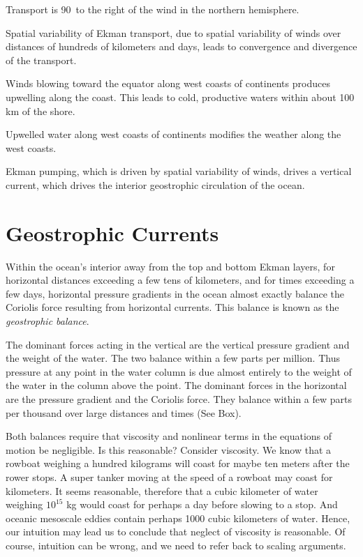 \begin{enumerate}
\vitem Transport is 90\degrees\ to the right of the wind in the
northern hemisphere.

\vitem Spatial variability of Ekman transport, due to spatial
variability of winds over distances of hundreds of kilometers and
days, leads to convergence and divergence of the transport.
\begin{enumerate}
\vitem Winds blowing toward the equator along west coasts of
continents produces upwelling along the
coast. This leads to cold, productive waters within about 100 km of
the shore.

\vitem Upwelled water along west coasts of continents modifies the
weather along the west coasts.
\end{enumerate}

\vitem Ekman pumping, which is driven by spatial
variability of winds, drives a vertical current, which drives the
interior geostrophic circulation of the
ocean.
\end{enumerate}


\chapter{Geostrophic Currents}
Within the ocean's interior away from the top and bottom Ekman
layers, for horizontal distances exceeding a few
tens of kilometers, and for times exceeding a few days, horizontal
pressure gradients in the ocean almost exactly balance the Coriolis
force resulting from horizontal currents. This balance is known as the
\textit{geostrophic balance}.

The dominant forces acting in the vertical are the vertical pressure
gradient and the weight of the water. The two balance within a few
parts per million. Thus pressure at any point in the water column is
due almost entirely to the weight of the water in the column above the
point. The dominant forces in the horizontal are the pressure gradient
and the Coriolis force. They balance within a few parts per thousand
over large distances and times (See Box).

Both balances require that viscosity and nonlinear terms in the
equations of motion be negligible. Is this reasonable? Consider
viscosity. We know that a rowboat weighing a hundred kilograms will
coast for maybe ten meters after the rower stops. A super tanker
moving at the speed of a rowboat may coast for kilometers. It seems
reasonable, therefore that a cubic kilometer of water weighing
$10^{15}$ kg would coast for perhaps a day before slowing to a
stop. And oceanic mesoscale eddies contain
perhaps 1000 cubic kilometers of water. Hence, our intuition may lead
us to conclude that neglect of viscosity is reasonable.  Of course,
intuition can be wrong, and we need to refer back to scaling
arguments.

